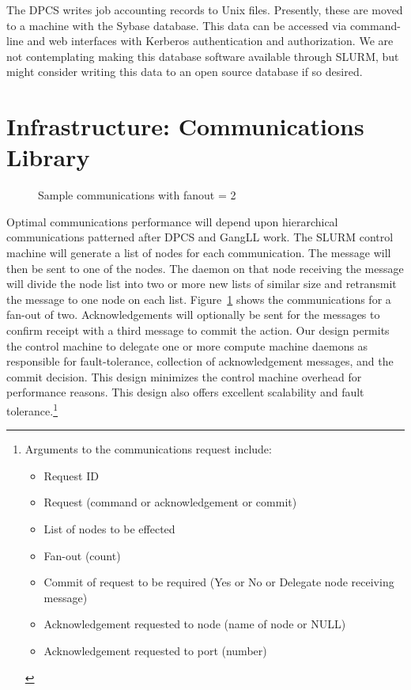 The DPCS writes job accounting records to Unix files. Presently, these are
moved to a machine with the Sybase database. This data can be accessed via
command-line and web interfaces with Kerberos authentication and authorization.
We are not contemplating making this database software available through SLURM,
but might consider writing this data to an open source database if so desired.

\section{Infrastructure: Communications Library}

\begin{figure}
\caption{Sample communications with fanout = 2}
\label{communicate}
\end{figure}
Optimal communications performance will depend upon hierarchical communications
patterned after DPCS and GangLL work. The SLURM control machine will generate a
list of nodes for each communication. The message will then be sent to one of
the nodes. 
The daemon on that node receiving the message will divide the node list into
two or more new lists of similar size and retransmit the message to one node on
each list. Figure~\ref{communicate} shows the communications for a fan-out of 
two.  Acknowledgements will optionally be sent for the messages to confirm 
receipt with a third message to commit the action. Our design permits the 
control machine to delegate one or more compute machine daemons as responsible 
for fault-tolerance, collection of acknowledgement messages, and the commit
decision. This design minimizes the control machine overhead for performance
reasons. This design also offers excellent scalability and fault 
tolerance.\footnote{Arguments to the communications request include:
\begin{itemize}
\item Request ID
\item Request (command or acknowledgement or commit)
\item List of nodes to be effected
\item Fan-out (count)
\item Commit of request to be required (Yes or No or Delegate node receiving
      message) 
\item Acknowledgement requested to node (name of node or NULL)
\item Acknowledgement requested to port (number)
\end{itemize} }

